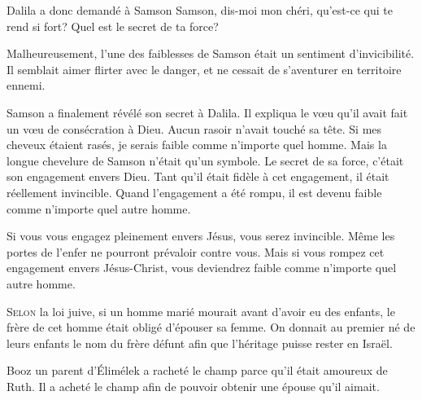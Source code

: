 Dalila a donc demandé à Samson\frcolon
 \Og Samson, dis-moi mon chéri, qu'est-ce qui te rend si fort?
 Quel est le secret de ta force? \Fg{}

Malheureusement, l'une des faiblesses de Samson était
 un sentiment d'invicibilité.
 Il semblait aimer flirter avec le danger,
 et ne cessait de s'aventurer en territoire ennemi.

Samson a finalement révélé son secret à Dalila.
 Il expliqua le v\oe{}u qu'il avait fait
 \ocadr un v\oe{}u de consécration à Dieu.
 Aucun rasoir n'avait touché sa tête.
 \Og Si mes cheveux étaient rasés,
 je serais faible comme n'importe quel homme. \Fg{}
 Mais la longue chevelure de Samson n'était qu'un symbole.
 Le secret de sa force, c'était son engagement envers Dieu.
 Tant qu'il était fidèle à cet engagement, il était réellement invincible.
 Quand l'engagement a été rompu, il est devenu faible
 comme n'importe quel autre homme.


Si vous vous engagez pleinement envers Jésus, vous serez invincible.
 Même les portes de l'enfer ne pourront prévaloir contre vous.
 Mais si vous rompez cet engagement envers Jésus-Christ,
 vous deviendrez faible comme n'importe quel autre homme. 

\dvrule






\lettrine{S}{elon} la loi juive, si un homme marié mourait 
 avant d'avoir eu des enfants, le frère de cet homme était obligé
 d'épouser sa femme.
 On donnait au premier né de leurs enfants le nom du frère défunt
 afin que l'héritage puisse rester en Israël.

Booz \ocadr un parent d'Élimélek \fcadr{} a racheté le champ parce
 qu'il était amoureux de Ruth.
 Il a acheté le champ afin de pouvoir obtenir une épouse qu'il aimait.

